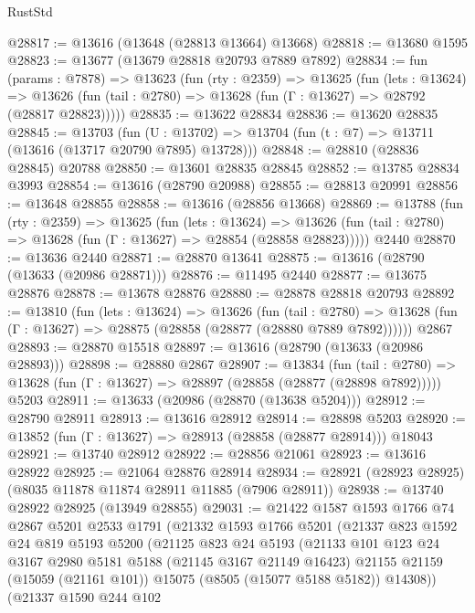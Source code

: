 \begin{lexlean}{RustStd}
\begin{coremodule}
@28817 := @13616 (@13648 (@28813 @13664) @13668)
@28818 := @13680 @1595
@28823 := @13677 (@13679 @28818 @20793 @7889 @7892)
@28834 := fun (params : @7878) =>
  @13623
    (fun (rty : @2359) =>
    @13625
      (fun (lets : @13624) =>
      @13626 (fun (tail : @2780) => @13628 (fun (Γ : @13627) => @28792 (@28817 @28823)))))
@28835 := @13622 @28834
@28836 := @13620 @28835
@28845 := @13703
    (fun (U : @13702) => @13704 (fun (t : @7) => @13711 (@13616 (@13717 @20790 @7895) @13728)))
@28848 := @28810 (@28836 @28845) @20788
@28850 := @13601 @28835 @28845
@28852 := @13785 @28834 @3993
@28854 := @13616 (@28790 @20988)
@28855 := @28813 @20991
@28856 := @13648 @28855
@28858 := @13616 (@28856 @13668)
@28869 := @13788
    (fun (rty : @2359) =>
    @13625
      (fun (lets : @13624) =>
      @13626 (fun (tail : @2780) => @13628 (fun (Γ : @13627) => @28854 (@28858 @28823)))))
    @2440
@28870 := @13636 @2440
@28871 := @28870 @13641
@28875 := @13616 (@28790 (@13633 (@20986 @28871)))
@28876 := @11495 @2440
@28877 := @13675 @28876
@28878 := @13678 @28876
@28880 := @28878 @28818 @20793
@28892 := @13810
    (fun (lets : @13624) =>
    @13626
      (fun (tail : @2780) =>
      @13628 (fun (Γ : @13627) => @28875 (@28858 (@28877 (@28880 @7889 @7892))))))
    @2867
@28893 := @28870 @15518
@28897 := @13616 (@28790 (@13633 (@20986 @28893)))
@28898 := @28880 @2867
@28907 := @13834
    (fun (tail : @2780) => @13628 (fun (Γ : @13627) => @28897 (@28858 (@28877 (@28898 @7892)))))
    @5203
@28911 := @13633 (@20986 (@28870 (@13638 @5204)))
@28912 := @28790 @28911
@28913 := @13616 @28912
@28914 := @28898 @5203
@28920 := @13852 (fun (Γ : @13627) => @28913 (@28858 (@28877 @28914))) @18043
@28921 := @13740 @28912
@28922 := @28856 @21061
@28923 := @13616 @28922
@28925 := @21064 @28876 @28914
@28934 := @28921 (@28923 @28925) (@8035 @11878 @11874 @28911 @11885 (@7906 @28911))
@28938 := @13740 @28922 @28925 (@13949 @28855)
@29031 := @21422
    @1587
    @1593
    @1766
    @74
    @2867
    @5201
    @2533
    @1791
    (@21332
      @1593
      @1766
      @5201
      (@21337
        @823
        @1592
        @24
        @819
        @5193
        @5200
        (@21125
          @823
          @24
          @5193
          (@21133
            @101
            @123
            @24
            @3167
            @2980
            @5181
            @5188
            (@21145 @3167 @21149 @16423)
            @21155
            @21159
            (@15059 (@21161 @101))
            @15075
            (@8505 (@15077 @5188 @5182))
            @14308))
        (@21337
          @1590
          @244
          @102

\end{coremodule}
\end{lexlean}
